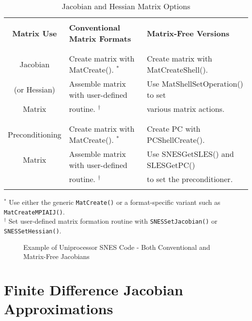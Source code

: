 \begin{center}
\begin{table}[H]
\begin{tabular}{|c|l|l|} \hline
& & \\
{\bf Matrix Use}      & {\bf Conventional Matrix Formats}          & {\bf Matrix-Free Versions}\\ 
& & \\ \hline
& & \\
Jacobian        & Create matrix with MatCreate(). $ ^* $ & Create matrix with MatCreateShell().\\
(or Hessian)    & Assemble matrix with user-defined     & Use MatShellSetOperation() to set\\
Matrix          & routine. $ ^\dagger $                         & various matrix actions.\\
& & \\ \hline
& & \\
Preconditioning  & Create matrix with MatCreate(). $ ^* $ & Create PC with PCShellCreate().\\
Matrix           & Assemble matrix with user-defined & Use SNESGetSLES() and SLESGetPC()\\
                & routine. $ ^\dagger $         & to set the preconditioner.\\ 

& & \\ \hline
\end{tabular}

\medskip
$ ^* $ Use either the generic {\tt MatCreate()} or a format-specific variant
   such as {\tt MatCreateMPIAIJ()}.\\
$ ^\dagger $ Set user-defined matrix formation routine with {\tt SNESSetJacobian()} or
   {\tt SNESSetHessian()}.
\medskip
\caption{Jacobian and Hessian Matrix Options}
\label{table:jacobians}
\end{table}
\end{center}

\begin{figure}[H]
{\small
{}
}
\caption{Example of Uniprocessor SNES Code - Both Conventional and Matrix-Free Jacobians}
\label{fig:snesexample2}
\end{figure} 

\section{Finite Difference Jacobian Approximations}
\label{sec:fdmatrix}

